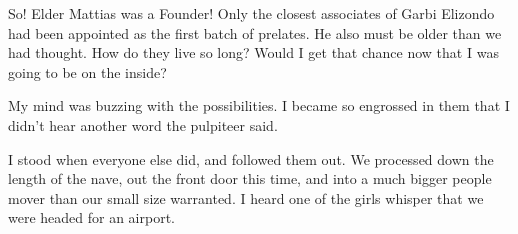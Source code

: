 So! Elder Mattias was a Founder! Only the closest associates of Garbi Elizondo had been appointed as the first batch of prelates. He also must be older than we had thought. How do they live so long? Would I get that chance now that I was going to be on the inside?

My mind was buzzing with the possibilities. I became so engrossed in them that I didn't hear another word the pulpiteer said.

I stood when everyone else did, and followed them out. We processed down the length of the nave, out the front door this time, and into a much bigger people mover than our small size warranted. I heard one of the girls whisper that we were headed for an airport.

\newpage
\thispagestyle{empty}
